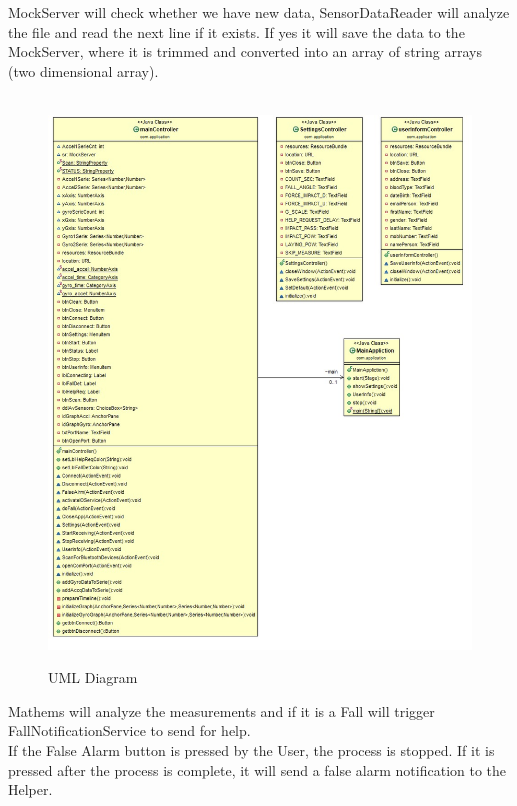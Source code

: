 \documentclass[hidelinks,conference,12pt]{IEEETran}
\begin{document}
\clearpage
MockServer will check whether we have new data, SensorDataReader will analyze the file and read the next line if it exists. If yes it will save the data to the MockServer, where it is trimmed and converted into an array of string arrays (two dimensional array). \\\\
\FloatBarrier
\begin{figure}[!h]
	\centering
	\caption{UML Diagram}
	\includegraphics[scale=0.42]{images/UML1.jpeg}
	\label{img:UML1}
\end{figure}
\FloatBarrier

Mathems will analyze the measurements and if it is a Fall will trigger FallNotificationService to send for help.\\ If the False Alarm button is pressed by the User, the process is stopped. If it is pressed after the process is complete, it will send a false alarm notification to the Helper.
\end{document}
